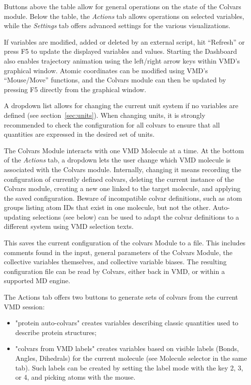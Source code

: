 {Buttons above the table allow for general operations on the state of the Colvars module.
Below the table, the \textit{Actions} tab allows operations on selected variables, while the \textit{Settings} tab offers advanced settings for the various visualizations.

If variables are modified, added or deleted by an external script, hit ``Refresh'' or press F5 to update the displayed variables and values.
Starting the Dashboard also enables trajectory animation using the left/right arrow keys within VMD's graphical window.
Atomic coordinates can be modified using VMD's ``Mouse/Move'' functions, and the Colvars module can then be updated by pressing F5 directly from the graphical window.

A dropdown list allows for changing the current unit system if no variables are defined (see section~\ref{sec:units}).
When changing units, it is strongly recommended to check the configuration for all colvars to ensure that all quantities are expressed in the desired set of units.

The Colvars Module interacts with one VMD Molecule at a time.
At the bottom of the \textit{Actions} tab, a  dropdown lets the user change which VMD molecule is associated with the Colvars module.
Internally, changing it means recording the configuration of currently defined colvars, deleting the current instance of the Colvars module,
creating a new one linked to the target molecule, and applying the saved configuration.
Beware of incompatible colvar definitions, such as atom groups listing atom IDs that exist in one molecule, but not the other.
Auto-updating selections (see below) can be used to adapt the colvar definitions to a different system using VMD selection texts.


This saves the current configuration of the colvars Module to a file.
This includes comments found in the input, general parameters of the Colvars Module, the collective variables themselves, and collective variable biases.
The resulting configuration file can be read by Colvars, either back in VMD, or within a supported MD engine.



The Actions tab offers two buttons to generate sets of colvars from the current VMD session:
\begin{itemize}
  \item "protein auto-colvars" creates variables describing classic quantities used to describe protein structures;
  \item "colvars from VMD labels" creates variables based on visible labels (Bonds, Angles, Dihedrals) for the current molecule
  (see Molecule selector in the same tab). Such labels can be created by setting the label mode with the key 2, 3, or 4, and picking atoms with the mouse.
\end{itemize}

}
